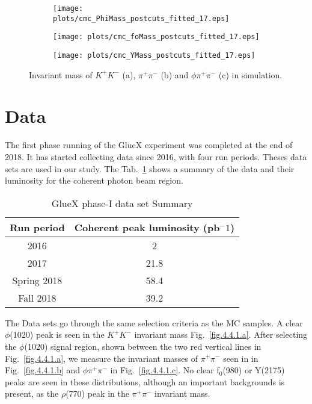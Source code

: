 \begin{figure}[H]
    \centering
    \begin{subfigure}[b]{0.45\textwidth}
        \texttt{[image: plots/cmc\_PhiMass\_postcuts\_fitted\_17.eps]}
        \caption{}
        \label{fig.4.3.1.a}
    \end{subfigure}
    \begin{subfigure}[b]{0.45\textwidth}
        \texttt{[image: plots/cmc\_foMass\_postcuts\_fitted\_17.eps]}
        \caption{}
        \label{fig.4.3.1.b}
    \end{subfigure}
    \begin{subfigure}[b]{0.45\textwidth}
        \texttt{[image: plots/cmc\_YMass\_postcuts\_fitted\_17.eps]}
        \caption{}
        \label{fig.4.3.1.c}
    \end{subfigure}
    \caption{Invariant mass of $K^+ K^-$ (a), $\pi^+ \pi^-$ (b) and $\phi \pi^+ \pi^-$ (c) in simulation.}
    \label{fig.4.3.1}
\end{figure}

\section{Data}
\label{p.4.4}

The first phase running of the GlueX experiment was completed at the end of 2018. It has started collecting data since 2016,  with four run periods. Theses data sets are used in our study. The Tab.~\ref{tab.4.4} shows a summary of the data and their luminosity for the coherent photon beam region.

\begin{table}[H]
    \centering
    \caption{GlueX phase-I data set Summary}
    \label{tab.4.4}
    \begin{tabular}{|c|c|}
        \hline
        Run period & Coherent peak luminosity (pb$^-1$)\\
        \hline
        2016 & 2 \\
        \hline
        2017 & 21.8 \\
        \hline
        Spring 2018 & 58.4 \\
        \hline
        Fall 2018 & 39.2 \\
        \hline
    \end{tabular}
\end{table}

The Data sets go through the same selection criteria as the MC samples. A clear $\phi$(1020) peak is seen in the $K^+K^-$ invariant mass Fig.~\ref{fig.4.4.1.a}. After selecting the $\phi$(1020) signal region, shown between the two red vertical lines in Fig.~\ref{fig.4.4.1.a}, we measure the invariant masses of $\pi^+ \pi^-$ seen in in Fig.~\ref{fig.4.4.1.b} and $\phi \pi^+ \pi^-$ in Fig.~\ref{fig.4.4.1.c}. No clear f$_0$(980) or Y(2175) peaks are seen in these distributions, although an important backgrounds is present, as the $\rho$(770) peak in the $\pi^+ \pi^-$ invariant mass.

